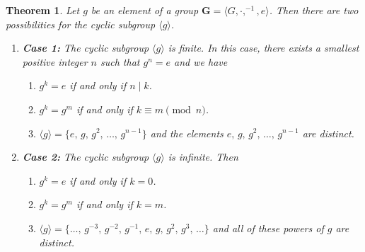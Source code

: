 \documentclass[12pt]{article}
\newcommand{\divides}{\ensuremath{\mid}}
\newcommand{\<}{\ensuremath{\langle}}
\renewcommand{\>}{\ensuremath{\rangle}}
\newcommand{\eye}{\ensuremath{e}}
\theoremstyle{plain}
\newtheorem{thm}{Theorem}%
\theoremstyle{definition}
\begin{document}
\begin{thm} 
\label{thm:4}
   Let $g$ be an element of a group $\mathbf{G} = \<G, \cdot, ^{-1}, e\>$.  
Then there are two possibilities for the cyclic subgroup $\langle g\rangle$.
\begin{enumerate}
\item[{ }]{\bf Case 1:}  The cyclic subgroup $\langle g\rangle$ is finite.  In this
case, there exists a smallest positive integer $n$ such that
$g^n=\eye$ and we have
\begin{enumerate}
\item $g^k=\eye$ if and only if $n\divides k$.
\item  $g^k=g^m$ if and only if $k\equiv m \pmod{n}$.
\item  $\langle g\rangle =\{\eye,\, g,\, g^2,\, \ldots,\, g^{n-1}\}$ and
the elements $\eye,\, g,\, g^2,\, \ldots,\, g^{n-1}$ are distinct.
\end{enumerate}

\item[{ }]{\bf Case 2:}  The cyclic subgroup $\langle g\rangle $ is infinite.
Then
\begin{enumerate}\addtocounter{enumii}{3}
\item $g^k=\eye$ if and only if $k=0$.
\item  $g^k=g^m$ if and only if $k=m$.
\item  $\langle g\rangle =\{ \ldots,\, g^{-3},\, g^{-2},\, g^{-1},\, \eye,\, g,\,g^2,\, g^3,\, \ldots\}$ and all of
these powers of $g$ are distinct.
\end{enumerate}
\end{enumerate}
\end{thm}
\end{document}
